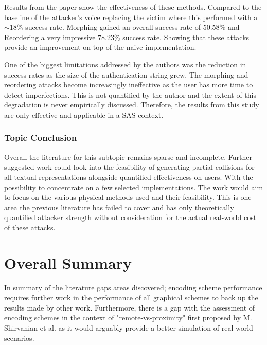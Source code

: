 Results from the paper show the effectiveness of these 
methods. Compared to the baseline of the attacker's voice 
replacing the victim where this performed with a 
$\sim$18\% success rate. Morphing gained an 
overall success rate of 50.58\% and Reordering a very 
impressive 78.23\% success rate. Showing that these 
attacks provide an improvement on top of the naive implementation.

One of the biggest limitations addressed by the authors 
was the reduction in success rates as the size of the 
authentication string grew. The morphing and reordering 
attacks become increasingly ineffective as the user has 
more time to detect imperfections. This is not quantified by 
the author and the extent of this degradation is never 
empirically discussed. Therefore, the results from this 
study are only effective and applicable in a SAS context.

\subsubsection*{Topic Conclusion}
Overall the literature for this subtopic remains sparse and incomplete. Further suggested work could look into the feasibility of generating partial collisions for all textual representations alongside quantified effectiveness on users. With the possibility to concentrate on a few selected implementations. The work would aim to focus on the various physical methods used and their feasibility. This is one area the previous literature has failed to cover and has only theoretically quantified attacker strength without consideration for the actual real-world cost of these attacks.

\section{Overall Summary}
In summary of the literature gaps areas discovered; encoding scheme performance requires further work in the performance of all graphical schemes to back up the results made by other work. Furthermore, there is a gap with the assessment of encoding schemes in the context of "remote-vs-proximity" first proposed by M. Shirvanian et al. as it would arguably provide a better simulation of real world scenarios.

